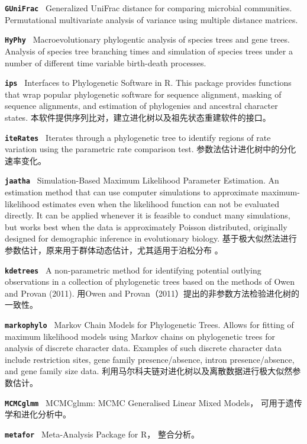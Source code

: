 \documentclass[10pt,landscape]{article}
\newcommand{\bcode}[1]{\texttt{\textbf{#1}}}
\begin{document}
\begin{CJK}{UTF8}{gbsn}
\begin{multicols}{3}
\bcode{GUniFrac       } Generalized UniFrac distance for comparing microbial communities. Permutational multivariate analysis of variance using multiple distance matrices.

\bcode{HyPhy          } Macroevolutionary phylogentic analysis of species trees and gene trees. Analysis of species tree branching times and simulation of species trees under a number of different time variable birth-death processes.

\bcode{ips            } Interfaces to Phylogenetic Software in R. This package provides functions that wrap popular phylogenetic software for sequence alignment, masking of sequence alignments, and estimation of phylogenies and ancestral character states. 本软件提供序列比对，建立进化树以及祖先状态重建软件的接口。 

\bcode{iteRates       } Iterates through a phylogenetic tree to identify regions of rate variation using the parametric rate comparison test. 参数法估计进化树中的分化速率变化。 

\bcode{jaatha         } Simulation-Based Maximum Likelihood Parameter Estimation. An estimation method that can use computer simulations to approximate maximum-likelihood estimates even when the likelihood function can not be evaluated directly. It can be applied whenever it is feasible to conduct many simulations, but works best when the data is approximately Poisson distributed, originally designed for demographic inference in evolutionary biology. 基于极大似然法进行参数估计，原来用于群体动态估计，尤其适用于泊松分布 。 

\bcode{kdetrees       } A non-parametric method for identifying potential outlying observations in a collection of phylogenetic trees based on the methods of Owen and Provan (2011). 用Owen and Provan（2011）提出的非参数方法检验进化树的一致性。

\bcode{markophylo     } Markov Chain Models for Phylogenetic Trees. Allows for fitting of maximum likelihood models using Markov chains on phylogenetic trees for analysis of discrete character data. Examples of such discrete character data include restriction sites, gene family presence/absence, intron presence/absence, and gene family size data. 利用马尔科夫链对进化树以及离散数据进行极大似然参数估计。 

\bcode{MCMCglmm       } MCMCglmm: MCMC Generalised Linear Mixed Models， 可用于遗传学和进化分析中。 

\bcode{metafor        } Meta-Analysis Package for R， 整合分析。


\end{multicols}
\end{CJK}
\end{document}
